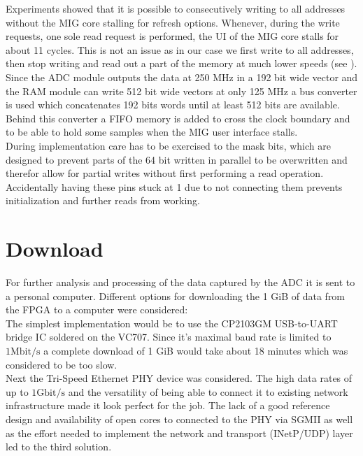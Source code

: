 Experiments showed that it is possible to consecutively writing to all
addresses without the \gls{MIG} core stalling for refresh options.
Whenever, during the write requests, one sole read request
is performed, the \gls{UI} of the \gls{MIG} core stalls for about 11
cycles. This is not an issue as in our case we first write
to all addresses, then stop writing and read out a part of the memory
at much lower speeds (see ). \\

Since the \gls{ADC} module outputs the data at 250 MHz in a 192 bit
wide vector and the \gls{RAM} module can write 512 bit wide vectors
at only 125 MHz a bus converter is used which concatenates 192 bits
words until at least 512 bits are available. Behind this converter
a \gls{FIFO} memory is added to cross the clock boundary and to be able
to hold some samples when the \gls{MIG} user interface stalls. \\

During implementation care has to be exercised to the mask bits,
which are designed to prevent parts of the 64 bit written in parallel to be
overwritten and therefor allow for partial writes without first performing
a read operation. Accidentally having these pins stuck at 1 due to
not connecting them prevents initialization and further reads from
working. \\

\section{Download}
\label{sec:fpga_download}
For further analysis and processing of the data captured by the \gls{ADC}
it is sent to a personal computer.
Different options for downloading the 1 GiB of data from the \gls{FPGA}
to a computer were considered: \\

The simplest implementation would be to use the CP2103GM
\acrshort{USB}-to-\acrshort{UART} bridge \gls{IC} soldered on the VC707.
Since it's maximal baud rate is limited to $1 \text{Mbit}/\text{s}$
a complete download of 1 GiB would take about 18 minutes which was
considered to be too slow. \\

Next the Tri-Speed Ethernet \gls{PHY} device was considered.
The high data rates of up to $1 \text{Gbit}/\text{s}$ and the versatility
of being able to connect it to existing network infrastructure made
it look perfect for the job. The lack of a good reference design and
availability of open cores to connected to the \gls{PHY} via
\gls{SGMII} as well as the effort needed to implement
the network and transport (\gls{INetP}/\gls{UDP}) layer
led to the third solution. \\

